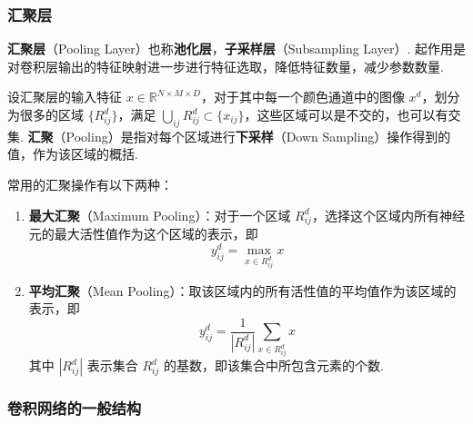 \documentclass[12pt, a4paper, oneside]{ctexart}
\numberwithin{equation}{section}  %
\begin{document}
\subsubsection{汇聚层}

\textbf{汇聚层}（Pooling
Layer）也称\textbf{池化层}，\textbf{子采样层}（Subsampling Layer）.
起作用是对卷积层输出的特征映射进一步进行特征选取，降低特征数量，减少参数数量.

设汇聚层的输入特征
\(x\in\mathbb{R}^{N\times M\times D}\)，对于其中每一个颜色通道中的图像
\(x^d\)，划分为很多的区域 \(\{R_{ij}^d\}\)，满足
\(\bigcup_{ij} R_{ij}^d\subset\{x_{ij}\}\)，这些区域可以是不交的，也可以有交集.
\textbf{汇聚}（Pooling）是指对每个区域进行\textbf{下采样}（Down
Sampling）操作得到的值，作为该区域的概括.

常用的汇聚操作有以下两种：
\begin{enumerate}
\def\labelenumi{\arabic{enumi}.}
\item
  \textbf{最大汇聚}（Maximum Pooling）：对于一个区域
  \(R^d_{ij}\)，选择这个区域内所有神经元的最大活性值作为这个区域的表示，即
  \begin{equation}
    y^d_{ij} = \max_{x\in R^d_{ij}}x
  \end{equation}
\item
  \textbf{平均汇聚}（Mean
  Pooling）：取该区域内的所有活性值的平均值作为该区域的表示，即
  \begin{equation}
    y_{ij}^d=\frac{1}{|R_{ij}^d|}\sum_{x\in R_{ij}^d}x
  \end{equation}
  其中 \(|R_{ij}^d|\) 表示集合 \(R_{ij}^d\)
  的基数，即该集合中所包含元素的个数.
\end{enumerate}

\subsubsection{卷积网络的一般结构}
\end{document}
